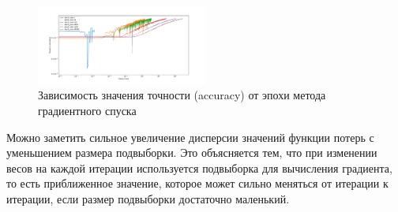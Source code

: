 \documentclass[a4paper, 11pt]{article}
\begin{document}
\begin{figure}[H]
\begin{multicols}{2}
\begin{center}
                        \caption{Зависимость значения точности (accuracy) от эпохи метода градиентного спуска} \label{exp3:sgd_acc_iter}
                        \includegraphics[width=0.5\textwidth, height=0.25\textheight]{../graphs/exp3_accuracy_SGD_bs_epoch_num_alpha=1_beta=0,01.pdf}
                    \end{center}
                \end{multicols}
            \end{figure}
        
            Можно заметить сильное увеличение дисперсии значений функции потерь с уменьшением размера подвыборки. Это объясняется тем, что при изменении весов на каждой итерации используется подвыборка для вычисления градиента, то есть приближенное значение, которое может сильно меняться от итерации к итерации, если размер подвыборки достаточно маленький.
            
\end{document}
